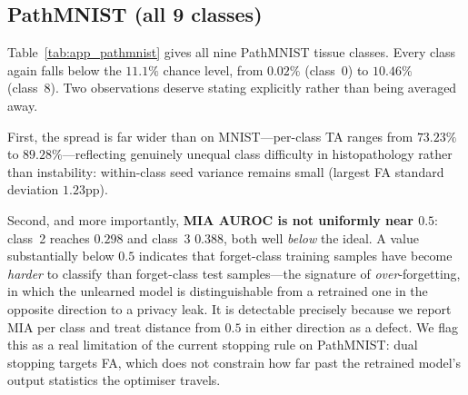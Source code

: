 \documentclass{article}
\theoremstyle{remark}
\theoremstyle{plain}
\begin{document}
\subsection{PathMNIST (all 9 classes)}

Table~\ref{tab:app_pathmnist} gives all nine PathMNIST tissue classes. Every
class again falls below the $11.1\%$ chance level, from $0.02\%$ (class~0) to
$10.46\%$ (class~8). Two observations deserve stating explicitly rather than
being averaged away.

First, the spread is far wider than on MNIST---per-class TA ranges from
$73.23\%$ to $89.28\%$---reflecting genuinely unequal class difficulty in
histopathology rather than instability: within-class seed variance remains small
(largest FA standard deviation $1.23$pp).

Second, and more importantly, \textbf{MIA AUROC is not uniformly near $0.5$}:
class~2 reaches $0.298$ and class~3 $0.388$, both well \emph{below} the ideal.
A value substantially below $0.5$ indicates that forget-class training samples
have become \emph{harder} to classify than forget-class test samples---the
signature of \emph{over}-forgetting, in which the unlearned model is
distinguishable from a retrained one in the opposite direction to a privacy
leak. It is detectable precisely because we report MIA per class and treat
distance from $0.5$ in either direction as a defect. We flag this as a real
limitation of the current stopping rule on PathMNIST: dual stopping targets FA,
which does not constrain how far past the retrained model's output statistics the
optimiser travels.
\end{document}
